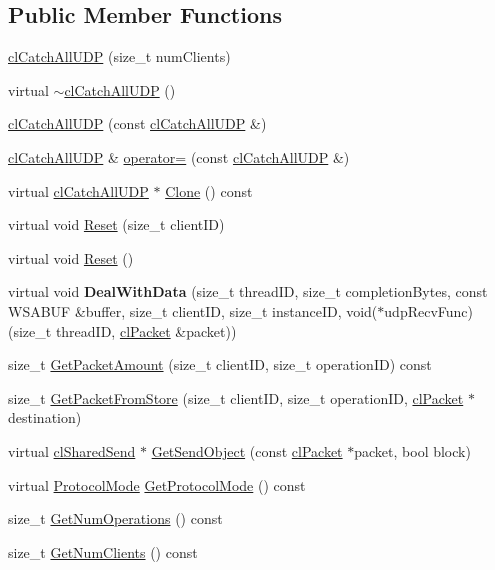 \subsection*{Public Member Functions}
\begin{DoxyCompactItemize}
\item 
\hyperlink{classcl_catch_all_u_d_p_acd8ff42a8470b118f01043b06e0dc1a9}{clCatchAllUDP} (size\_\-t numClients)
\item 
virtual \hyperlink{classcl_catch_all_u_d_p_a0e2b86012bfcbd94d61ac97ee9180091}{$\sim$clCatchAllUDP} ()
\item 
\hyperlink{classcl_catch_all_u_d_p_ad92bb2fcc980ef4f7d17de5071247ce3}{clCatchAllUDP} (const \hyperlink{classcl_catch_all_u_d_p}{clCatchAllUDP} \&)
\item 
\hyperlink{classcl_catch_all_u_d_p}{clCatchAllUDP} \& \hyperlink{classcl_catch_all_u_d_p_a9fcf6da85ee5f7a16523c723c497a4f8}{operator=} (const \hyperlink{classcl_catch_all_u_d_p}{clCatchAllUDP} \&)
\item 
virtual \hyperlink{classcl_catch_all_u_d_p}{clCatchAllUDP} $\ast$ \hyperlink{classcl_catch_all_u_d_p_a0e329ffd49f681f9e81938d20ac1ab06}{Clone} () const 
\item 
virtual void \hyperlink{classcl_catch_all_u_d_p_ad4530482136db2ffffff7fdac7f2e00f}{Reset} (size\_\-t clientID)
\item 
virtual void \hyperlink{classcl_catch_all_u_d_p_ab73dbee966b725003aa44dcf88eb89d5}{Reset} ()
\item 
\hypertarget{classcl_catch_all_u_d_p_a0010d41a81f6eed7625d9f88dc1d6d7d}{
virtual void {\bfseries DealWithData} (size\_\-t threadID, size\_\-t completionBytes, const WSABUF \&buffer, size\_\-t clientID, size\_\-t instanceID, void($\ast$udpRecvFunc)(size\_\-t threadID, \hyperlink{classcl_packet}{clPacket} \&packet))}
\label{classcl_catch_all_u_d_p_a0010d41a81f6eed7625d9f88dc1d6d7d}

\item 
size\_\-t \hyperlink{classcl_catch_all_u_d_p_a366bd96e44b0352b9d35b626c5b60bfc}{GetPacketAmount} (size\_\-t clientID, size\_\-t operationID) const 
\item 
size\_\-t \hyperlink{classcl_catch_all_u_d_p_a61371c284ba4ce5e83ba3679439cf765}{GetPacketFromStore} (size\_\-t clientID, size\_\-t operationID, \hyperlink{classcl_packet}{clPacket} $\ast$destination)
\item 
virtual \hyperlink{classcl_shared_send}{clSharedSend} $\ast$ \hyperlink{classcl_catch_all_u_d_p_a6651f3534e139451f9bbabe16e00671c}{GetSendObject} (const \hyperlink{classcl_packet}{clPacket} $\ast$packet, bool block)
\item 
virtual \hyperlink{classcl_shared_protocol_a4b0b9c82b8ae4eee78c6308c35afd47b}{ProtocolMode} \hyperlink{classcl_catch_all_u_d_p_adacc5977909396017910dcb3ab44c395}{GetProtocolMode} () const 
\item 
size\_\-t \hyperlink{classcl_catch_all_u_d_p_aebbfac2716ad96b0344fe8ab776d771b}{GetNumOperations} () const 
\item 
size\_\-t \hyperlink{classcl_catch_all_u_d_p_ac4eb348fdfc5b85a58aab9c48023171c}{GetNumClients} () const 
\end{DoxyCompactItemize}
